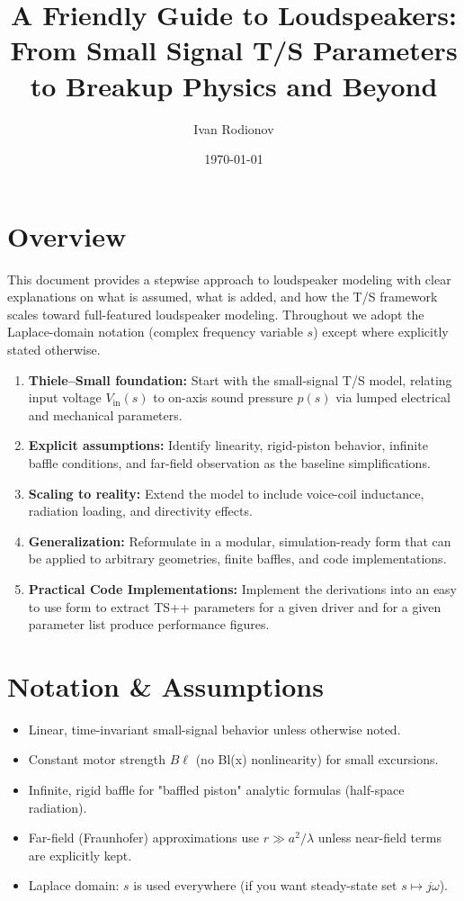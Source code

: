 \title{A Friendly Guide to Loudspeakers:\\
From Small Signal T/S Parameters to Breakup Physics and Beyond}
\date{\today}
\author{Ivan Rodionov}


\maketitle


\newpage
\section*{Overview}
This document provides a stepwise approach to loudspeaker modeling with clear explanations on what is assumed, what is added, and how the T/S framework scales toward full-featured loudspeaker modeling. Throughout we adopt the Laplace-domain notation (complex frequency variable $s$) except where explicitly stated otherwise.

\begin{enumerate}
    \item \textbf{Thiele--Small foundation:} Start with the small-signal T/S model, relating input voltage $V_{\mathrm{in}}(s)$ to on-axis sound pressure $p(s)$ via lumped electrical and mechanical parameters.  
    \item \textbf{Explicit assumptions:} Identify linearity, rigid-piston behavior, infinite baffle conditions, and far-field observation as the baseline simplifications.  
    \item \textbf{Scaling to reality:} Extend the model to include voice-coil inductance, radiation loading, and directivity effects.  
    \item \textbf{Generalization:} Reformulate in a modular, simulation-ready form that can be applied to arbitrary geometries, finite baffles, and code implementations.  
    \item \textbf{Practical Code Implementations:} Implement the derivations into an easy to use form to extract TS++ parameters for a given driver and for a given parameter list produce performance figures.  
\end{enumerate}

\section*{Notation \& Assumptions}
\begin{itemize}
  \item Linear, time-invariant small-signal behavior unless otherwise noted.  
  \item Constant motor strength $B\ell$ (no Bl(x) nonlinearity) for small excursions.  
  \item Infinite, rigid baffle for "baffled piston" analytic formulas (half-space radiation).  
  \item Far-field (Fraunhofer) approximations use $r\gg a^2/\lambda$ unless near-field terms are explicitly kept.  
  \item Laplace domain: $s$ is used everywhere (if you want steady-state set $s\mapsto j\omega$).
\end{itemize}

